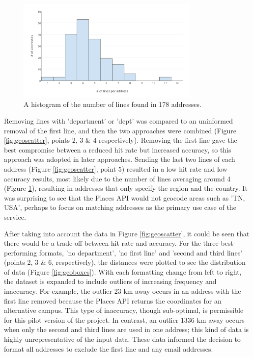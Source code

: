 \documentclass[Report.tex]{subfiles}
\begin{document}
\begin{figure}[!ht]
\begin{center}
	\includegraphics[width=0.8\textwidth]{../lib/images/address-lines-histogram}
	\caption{A histogram of the number of lines found in 178 addresses.\label{fig:addresslines}}
\end{center}
\end{figure}

\noindent Removing lines with 'department' or 'dept' was compared to an uninformed removal of the first line, and then the two approaches were combined (Figure \ref{fig:geoscatter}, points 2, 3 \& 4 respectively). Removing the first line gave the best compromise between a reduced hit rate but increased accuracy, so this approach was adopted in later approaches. Sending the last two lines of each address (Figure \ref{fig:geoscatter}, point 5) resulted in a low hit rate and low accuracy results, most likely due to the number of lines averaging around 4 (Figure \ref{fig:addresslines}), resulting in addresses that only specify the region and the country. It was surprising to see that the Places API would not geocode areas such as 'TN, USA', perhaps to focus on matching addresses as the primary use case of the service.\newline

\noindent After taking into account the data in Figure \ref{fig:geoscatter}, it could be seen that there would be a trade-off between hit rate and accuracy. For the three best-performing formats, 'no department', 'no first line' and 'second and third lines' (points 2, 3 \& 6, respectively), the distances were plotted to see the distribution of data (Figure \ref{fig:geoboxes}). With each formatting change from left to right, the dataset is expanded to include outliers of increasing frequency and inaccuracy. For example, the outlier 23 km away occurs in an address with the first line removed because the Places API returns the coordinates for an alternative campus. This type of inaccuracy, though sub-optimal, is permissible for this pilot version of the project. In contrast, an outlier 1336 km away occurs when only the second and third lines are used in one address; this kind of data is highly unrepresentative of the input data. These data informed the decision to format all addresses to exclude the first line and any email addresses.
\end{document}
